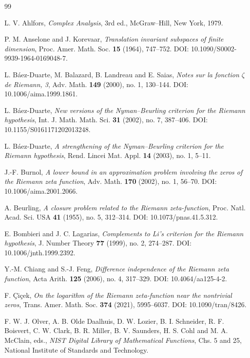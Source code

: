 \documentclass[11pt]{amsart}
\numberwithin{equation}{section}
\begin{document}
\begin{thebibliography}{99}

L. V. Ahlfors,
\emph{Complex Analysis}, 3rd ed.,
McGraw--Hill, New York, 1979.

P. M. Anselone and J. Korevaar,
\emph{Translation invariant subspaces of finite dimension},
Proc. Amer. Math. Soc. \textbf{15} (1964), 747--752.
DOI: 10.1090/S0002-9939-1964-0169048-7.

L. B\'aez-Duarte, M. Balazard, B. Landreau and E. Saias,
\emph{Notes sur la fonction $\zeta$ de Riemann, 3},
Adv. Math. \textbf{149} (2000), no. 1, 130--144.
DOI: 10.1006/aima.1999.1861.

L. B\'aez-Duarte,
\emph{New versions of the Nyman--Beurling criterion for the Riemann hypothesis},
Int. J. Math. Math. Sci. \textbf{31} (2002), no. 7, 387--406.
DOI: 10.1155/S0161171202013248.

L. B\'aez-Duarte,
\emph{A strengthening of the Nyman--Beurling criterion for the Riemann hypothesis},
Rend. Lincei Mat. Appl. \textbf{14} (2003), no. 1, 5--11.

J.-F. Burnol,
\emph{A lower bound in an approximation problem involving the zeros of the Riemann zeta function},
Adv. Math. \textbf{170} (2002), no. 1, 56--70.
DOI: 10.1006/aima.2001.2066.

A. Beurling,
\emph{A closure problem related to the Riemann zeta-function},
Proc. Natl. Acad. Sci. USA \textbf{41} (1955), no. 5, 312--314.
DOI: 10.1073/pnas.41.5.312.

E. Bombieri and J. C. Lagarias,
\emph{Complements to Li's criterion for the Riemann hypothesis},
J. Number Theory \textbf{77} (1999), no. 2, 274--287.
DOI: 10.1006/jnth.1999.2392.

Y.-M. Chiang and S.-J. Feng,
\emph{Difference independence of the Riemann zeta function},
Acta Arith. \textbf{125} (2006), no. 4, 317--329.
DOI: 10.4064/aa125-4-2.

F. \c{C}i\c{c}ek,
\emph{On the logarithm of the Riemann zeta-function near the nontrivial zeros},
Trans. Amer. Math. Soc. \textbf{374} (2021), 5995--6037.
DOI: 10.1090/tran/8426.

F. W. J. Olver, A. B. Olde Daalhuis, D. W. Lozier, B. I. Schneider,
R. F. Boisvert, C. W. Clark, B. R. Miller, B. V. Saunders,
H. S. Cohl and M. A. McClain, eds.,
\emph{NIST Digital Library of Mathematical Functions},
Chs. 5 and 25, National Institute of Standards and Technology.


\end{thebibliography}
\end{document}
